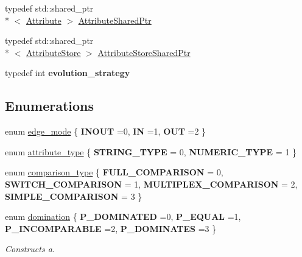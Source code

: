 \begin{DoxyCompactItemize}
typedef std\+::shared\+\_\+ptr\\*
$<$ \hyperlink{classmlnet_1_1_attribute}{Attribute} $>$ \hyperlink{namespacemlnet_a760c8b8d6997e73350446bafff35e6d6}{Attribute\+Shared\+Ptr}
\item 
typedef std\+::shared\+\_\+ptr\\*
$<$ \hyperlink{classmlnet_1_1_attribute_store}{Attribute\+Store} $>$ \hyperlink{namespacemlnet_a3d60b9ef6ef6489d000f6061e0a1bdf2}{Attribute\+Store\+Shared\+Ptr}
\item 
\hypertarget{namespacemlnet_ab2f8c10cae38d1bd0f2d438d7f35ab9e}{typedef int {\bfseries evolution\+\_\+strategy}}\label{namespacemlnet_ab2f8c10cae38d1bd0f2d438d7f35ab9e}

\end{DoxyCompactItemize}
\subsection*{Enumerations}
\begin{DoxyCompactItemize}
\item 
enum \hyperlink{namespacemlnet_aa4ac93b948a2c3582aeead3f1c4ff022}{edge\+\_\+mode} \{ {\bfseries I\+N\+O\+U\+T} =0, 
{\bfseries I\+N} =1, 
{\bfseries O\+U\+T} =2
 \}
\item 
enum \hyperlink{namespacemlnet_a8bd10c6e8e4d27ef4d974b3f576a3a06}{attribute\+\_\+type} \{ {\bfseries S\+T\+R\+I\+N\+G\+\_\+\+T\+Y\+P\+E} = 0, 
{\bfseries N\+U\+M\+E\+R\+I\+C\+\_\+\+T\+Y\+P\+E} = 1
 \}
\item 
enum \hyperlink{namespacemlnet_ac59b03c9fd702da21a0c3c2a4bba57c9}{comparison\+\_\+type} \{ {\bfseries F\+U\+L\+L\+\_\+\+C\+O\+M\+P\+A\+R\+I\+S\+O\+N} = 0, 
{\bfseries S\+W\+I\+T\+C\+H\+\_\+\+C\+O\+M\+P\+A\+R\+I\+S\+O\+N} = 1, 
{\bfseries M\+U\+L\+T\+I\+P\+L\+E\+X\+\_\+\+C\+O\+M\+P\+A\+R\+I\+S\+O\+N} = 2, 
{\bfseries S\+I\+M\+P\+L\+E\+\_\+\+C\+O\+M\+P\+A\+R\+I\+S\+O\+N} = 3
 \}
\item 
enum \hyperlink{namespacemlnet_a49cbf481a06184d43958acdfc5d4fc60}{domination} \{ {\bfseries P\+\_\+\+D\+O\+M\+I\+N\+A\+T\+E\+D} =0, 
{\bfseries P\+\_\+\+E\+Q\+U\+A\+L} =1, 
{\bfseries P\+\_\+\+I\+N\+C\+O\+M\+P\+A\+R\+A\+B\+L\+E} =2, 
{\bfseries P\+\_\+\+D\+O\+M\+I\+N\+A\+T\+E\+S} =3
 \}
\begin{DoxyCompactList}\small\item\em Constructs a. \end{DoxyCompactList}\end{DoxyCompactItemize}
